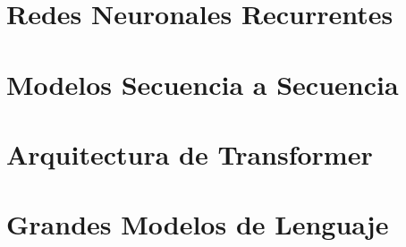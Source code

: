 \documentclass[11pt,fleqn]{book} %
\begin{document}
\chapter{Redes Neuronales Recurrentes}
\label{cap_rnn}




\chapter{Modelos Secuencia a Secuencia}
\label{cap_sec}



\chapter{Arquitectura de Transformer}
\label{cap_trans}






\chapter{Grandes Modelos de Lenguaje}
\label{cap_llm}




\end{document}
